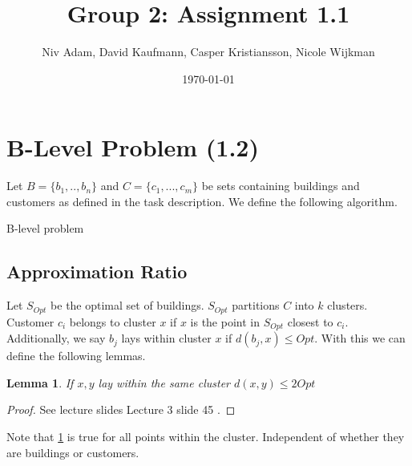 \documentclass{article}
\title{Group 2: Assignment 1.1}
\author{Niv Adam, David Kaufmann, Casper Kristiansson, Nicole Wijkman}
\date{\today}
\newtheorem{lemma}[theorem]{Lemma}
\begin{document}
\maketitle

\section{B-Level Problem (1.2)}
Let $B = \{b_1,..,b_n\}$ and $C = \{c_1,...,c_m\}$ be sets containing buildings and customers as defined in the task description. We define the following algorithm.
\begin{algorithm}
\caption{B-level problem}
\DontPrintSemicolon
{}
\end{algorithm}

\subsection{Approximation Ratio}
Let $S_{Opt}$ be the optimal set of buildings. $S_{Opt}$ partitions $C$ into $k$ clusters. Customer $c_i$ belongs to cluster $x$ if $x$ is the point in $S_{Opt}$ closest to $c_i$. Additionally, we say $b_j$ lays within cluster $x$ if $d(b_j,x) \leq Opt$. With this we can define the following lemmas.

\begin{lemma}\label{lma:SameCluster}
    If $x,y$ lay within the same cluster $d(x,y) \leq 2 Opt$
\end{lemma}
\begin{proof}
    See lecture slides Lecture 3 slide 45 \cite{Lecture3}.
\end{proof}
Note that \ref{lma:SameCluster} is true for all points within the cluster. Independent of whether they are buildings or customers.
\end{document}
